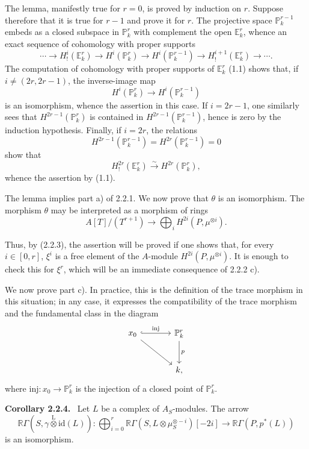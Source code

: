 \documentclass[11pt]{article}
\newenvironment{statement}[1]{\par\medskip\noindent\textbf{#1.}\ }{\par\medskip}
\providecommand{\lten}{\overset{\mathrm L}{\otimes}}
\providecommand{\lten}{\overset{\mathrm L}{\otimes}}
\providecommand{\lten}{\overset{\mathrm L}{\otimes}}
\providecommand{\lten}{\overset{\mathrm L}{\otimes}}
\providecommand{\lten}{\overset{\mathrm L}{\otimes}}
\providecommand{\lten}{\overset{\mathrm L}{\otimes}}
\providecommand{\lten}{\overset{\mathrm L}{\otimes}}
\begin{document}
The lemma, manifestly true for $r=0$, is proved by induction on $r$. Suppose therefore that it is true for $r-1$ and prove it for $r$. The projective space $\mathbb P_k^{r-1}$ embeds as a closed subspace in $\mathbb P_k^r$ with complement the open $\mathbb E_k^r$, whence an exact sequence of cohomology with proper supports
\[
\cdots\longrightarrow H_!^i(\mathbb E_k^r)\longrightarrow H^i(\mathbb P_k^r)
\longrightarrow H^i(\mathbb P_k^{r-1})\longrightarrow H_!^{i+1}(\mathbb E_k^r)\longrightarrow\cdots.
\]
The computation of cohomology with proper supports of $\mathbb E_k^r$ (1.1) shows that, if $i\ne(2r,2r-1)$, the inverse-image map
\[
H^i(\mathbb P_k^r)\longrightarrow H^i(\mathbb P_k^{r-1})
\]
is an isomorphism, whence the assertion in this case. If $i=2r-1$, one similarly sees that $H^{2r-1}(\mathbb P_k^r)$ is contained in $H^{2r-1}(\mathbb P_k^{r-1})$, hence is zero by the induction hypothesis. Finally, if $i=2r$, the relations
\[
H^{2r-1}(\mathbb P_k^{r-1})=H^{2r}(\mathbb P_k^{r-1})=0
\]
show that
\[
H_!^{2r}(\mathbb E_k^r)\xrightarrow{\sim}H^{2r}(\mathbb P_k^r),
\]
whence the assertion by (1.1).

The lemma implies part a) of 2.2.1. We now prove that $\theta$ is an isomorphism. The morphism $\theta$ may be interpreted as a morphism of rings
\[
A[T]/(T^{r+1})\longrightarrow\bigoplus_i H^{2i}(P,\mu^{\otimes i}).
\]


Thus, by (2.2.3), the assertion will be proved if one shows that, for every $i\in[0,r]$, $\xi^i$ is a free element of the $A$-module $H^{2i}(P,\mu^{\otimes i})$. It is enough to check this for $\xi^r$, which will be an immediate consequence of 2.2.2 c).

We now prove part c). In practice, this is the definition of the trace morphism in this situation; in any case, it expresses the compatibility of the trace morphism and the fundamental class in the diagram
\[
\begin{tikzcd}[column sep=large,row sep=large]
x_0 \arrow[r,hook,"\mathrm{inj}"] \arrow[dr] & \mathbb P^r_k \arrow[d,"p"]\\
& k ,
\end{tikzcd}
\]
where $\mathrm{inj}:x_0\to \mathbb P^r_k$ is the injection of a closed point of $\mathbb P^r_k$.

\begin{statement}{Corollary 2.2.4}
Let $L$ be a complex of $A_S$-modules. The arrow
\[
\mathbb{R}\Gamma(S,\gamma\lten\mathrm{id}(L)):
\bigoplus_{i=0}^r \mathbb{R}\Gamma(S,L\otimes\mu_S^{\otimes -i})[-2i]
\longrightarrow
\mathbb{R}\Gamma(P,p^*(L))
\]
is an isomorphism.
\end{statement}
\end{document}
